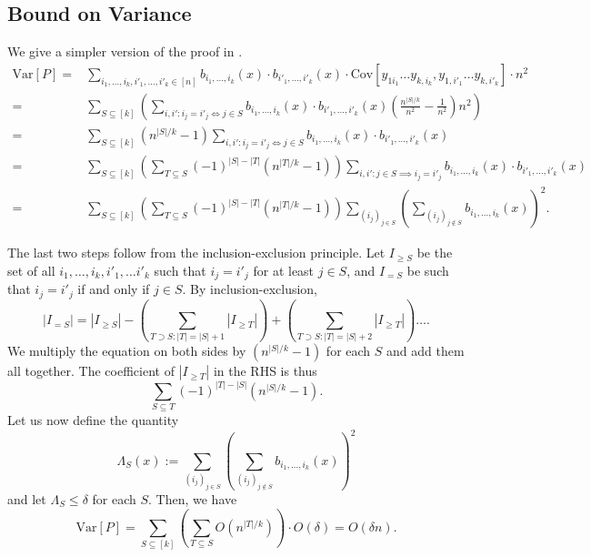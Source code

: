 \documentclass[12pt]{report}
\newcommand{\Var}{\mathrm{Var}}
\newcommand{\Cov}{\mathrm{Cov}}
\begin{document}
\subsection{Bound on Variance}
We give a simpler version of the proof in \cite{paper1}.
\begin{equation*}
\begin{split}
\Var[P] = & \sum_{i_1, \ldots, i_k, i'_1, \ldots, i'_k \in [n]} b_{i_1, \ldots, i_k}(x) \cdot b_{i'_1, \ldots, i'_k}(x) \cdot \Cov[y_{1 i_1} \ldots y_{k,i_k}, y_{1,i'_1} \ldots y_{k,i'_k}] \cdot n^2
\\
= & \sum_{S \subseteq [k]} \left(\sum_{i,i'\colon i_j = i'_j \iff j \in S} b_{i_1, \ldots, i_k}(x) \cdot b_{i'_1, \ldots, i'_k}(x) \left(\frac{n^{|S|/k}}{n^2} - \frac{1}{n^2}\right) n^2\right)
\\
= & \sum_{S \subseteq [k]} (n^{|S|/k} - 1) \sum_{i,i'\colon i_j = i'_j \iff j \in S} b_{i_1, \ldots, i_k}(x) \cdot b_{i'_1, \ldots, i'_k}(x)
\\
= & \sum_{S \subseteq [k]} \left(\sum_{T \subseteq S} (-1)^{|S| - |T|} (n^{|T|/k} - 1)\right) \sum_{i,i'\colon j \in S\implies i_j = i'_j} b_{i_1, \ldots, i_k}(x) \cdot b_{i'_1, \ldots, i'_k}(x)
\\
= & \sum_{S \subseteq [k]} \left(\sum_{T \subseteq S} (-1)^{|S| - |T|} (n^{|T|/k} - 1)\right) \sum_{(i_j)_{j \in S}} \left(\sum_{(i_j)_{j \notin S}} b_{i_1, \ldots, i_k}(x)\right)^2.
\end{split}
\end{equation*}

The last two steps follow from the inclusion-exclusion principle. Let $I_{\geq S}$ be the set of all $i_1, \ldots,  i_k, i'_1, \ldots i'_k$ such that $i_j = i'_j$ for at least $j \in S$, and $I_{= S}$ be such that $i_j = i'_j$ if and only if $j \in S$. By inclusion-exclusion,
\begin{equation*}
|I_{= S}| = |I_{\geq S}| - \left(\sum_{T \supset S\colon |T| = |S|+1} |I_{\geq T}|\right) + \left(\sum_{T \supset S\colon |T| = |S|+2} |I_{\geq T}|\right) \ldots.
\end{equation*}
We multiply the equation on both sides by $(n^{|S|/k} - 1)$ for each $S$ and add them all together. The coefficient of $|I_{\geq T}|$ in the RHS is thus
$$
\sum_{S \subseteq T} (-1)^{|T| - |S|} (n^{|S|/k} - 1).
$$
Let us now define the quantity
\begin{equation}
\Lambda_S(x) := \sum_{(i_j)_{j \in S}} \left(\sum_{(i_j)_{j \notin S}} b_{i_1, \ldots, i_k}(x)\right)^2
\end{equation}
and let $\Lambda_S \leq \delta$ for each $S$. Then, we have
\begin{equation*}
\Var[P] = \sum_{S \subseteq [k]} \left(\sum_{T \subseteq S} O(n^{|T|/k})\right) \cdot O(\delta) = O(\delta n).
\end{equation*}
\end{document}

